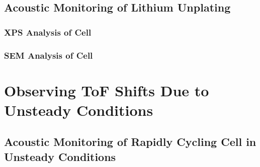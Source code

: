 \subsection{Acoustic Monitoring of Lithium Unplating}

\subsubsection{XPS Analysis of Cell}

\subsubsection{SEM Analysis of Cell}

\section{Observing ToF Shifts Due to Unsteady Conditions}

\subsection{Acoustic Monitoring of Rapidly Cycling Cell in Unsteady Conditions}